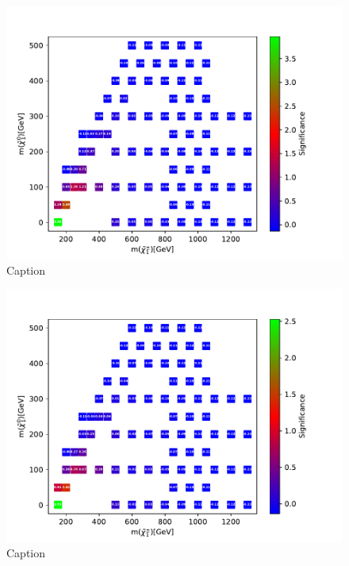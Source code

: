 \begin{figure}
    \centering
    \includegraphics[width = \textwidth]{Figures/Significances/significance_BDT_slepsnu_All_level.pdf}
    \caption{Caption}
    \label{fig:my_label}
\end{figure}

\begin{figure}
    \centering
    \includegraphics[width = \textwidth]{Figures/Significances/significance_BDT_slepsnu_Low_level.pdf}
    \caption{Caption}
    \label{fig:my_label}
\end{figure}


